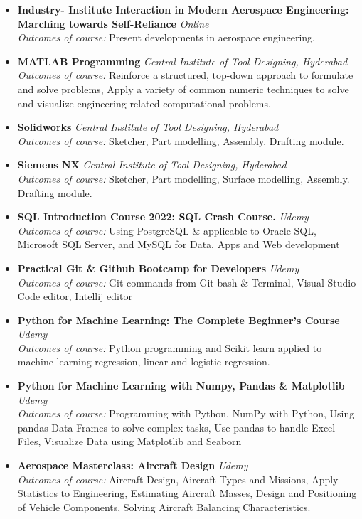 \documentclass[10pt,article]{article}
\newcommand{\resheading}[1]{{\noindent \large \colorbox{mygrey} { \begin{minipage}{0.99\textwidth}\centering{\textbf{#1 \vphantom{p\^{E}}}}\end{minipage}}}}
\begin{document}
\resheading{CERTIFICATION COURSES}
\begin{itemize}
\setlength\itemsep{-0.2em}
    \item \textbf{Industry- Institute Interaction in Modern Aerospace Engineering: Marching towards Self-Reliance} \hfill \textit{Online}\\
    \textit{Outcomes of course:} Present developments in aerospace engineering.
    \item \textbf{MATLAB Programming} \hfill \textit{Central Institute of Tool Designing, Hyderabad}\\
    \textit{Outcomes of course:} Reinforce a structured, top-down approach to formulate and solve problems, Apply a variety of common numeric techniques to solve and visualize engineering-related computational problems.
    \item \textbf{Solidworks} \hfill \textit{Central Institute of Tool Designing, Hyderabad}\\
    \textit{Outcomes of course:} Sketcher, Part modelling, Assembly. Drafting module.
    \item \textbf{Siemens NX} \hfill \textit{Central Institute of Tool Designing, Hyderabad}\\
    \textit{Outcomes of course:} Sketcher, Part modelling, Surface modelling, Assembly. Drafting module.
    \item \textbf{SQL Introduction Course 2022: SQL Crash Course.} \hfill \textit{Udemy}\\
    \textit{Outcomes of course:} Using PostgreSQL \& applicable to Oracle SQL, Microsoft SQL Server, and MySQL for Data, Apps and Web development
    \item \textbf{Practical Git \& Github Bootcamp for Developers} \hfill \textit{Udemy}\\
    \textit{Outcomes of course:} Git commands from Git bash \& Terminal, Visual  Studio Code editor, Intellij editor
    \item \textbf{Python for Machine Learning: The Complete Beginner's Course} \hfill \textit{Udemy}\\
    \textit{Outcomes of course:} Python programming and Scikit learn applied to machine learning regression, linear and logistic regression.
    \item \textbf{Python for Machine Learning with Numpy, Pandas \& Matplotlib} \hfill \textit{Udemy}\\
    \textit{Outcomes of course:} Programming with Python, NumPy with Python, Using pandas Data Frames to solve complex tasks, Use pandas to handle Excel Files, Visualize Data using Matplotlib and Seaborn
    \item \textbf{Aerospace Masterclass: Aircraft Design} \hfill \textit{Udemy}\\
    \textit{Outcomes of course:} Aircraft Design, Aircraft Types and Missions, Apply Statistics to Engineering, Estimating Aircraft Masses, Design and Positioning of Vehicle Components, Solving Aircraft Balancing Characteristics.
\end{itemize}
\end{document}
